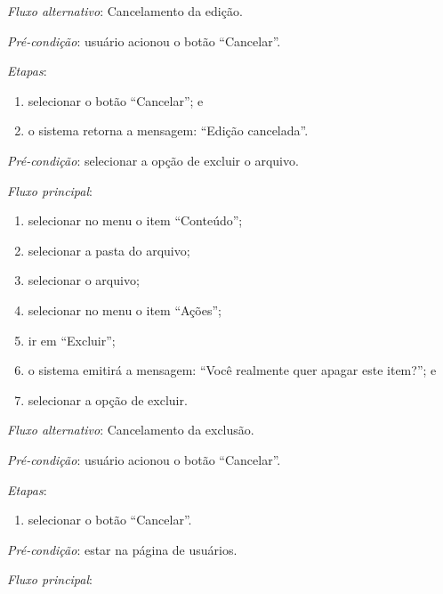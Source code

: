 \noindent \textit{Fluxo alternativo}: Cancelamento da edição.

\noindent \textit{Pré-condição}: usuário acionou o botão ``Cancelar''.

\noindent \textit{Etapas}:

\begin{enumerate}
    \item selecionar o botão ``Cancelar''; e
    \item o sistema retorna a mensagem: ``Edição cancelada''.
\end{enumerate}


\vspace{0.7cm}

\noindent \textit{Pré-condição}: selecionar a opção de excluir o arquivo.

\noindent \textit{Fluxo principal}:

\begin{enumerate}
    \item selecionar no menu o item ``Conteúdo'';
    \item selecionar a pasta do arquivo;
    \item selecionar o arquivo;
    \item selecionar no menu o item ``Ações'';
    \item ir em ``Excluir'';
    \item o sistema emitirá a mensagem: ``Você realmente quer apagar este item?''; e
    \item selecionar a opção de excluir.
\end{enumerate}

\noindent \textit{Fluxo alternativo}: Cancelamento da exclusão.

\noindent \textit{Pré-condição}: usuário acionou o botão ``Cancelar''.

\noindent \textit{Etapas}:

\begin{enumerate}
    \item selecionar o botão ``Cancelar''.
\end{enumerate}



\vspace{0.7cm}

\noindent \textit{Pré-condição}: estar na página de usuários.

\noindent \textit{Fluxo principal}:

